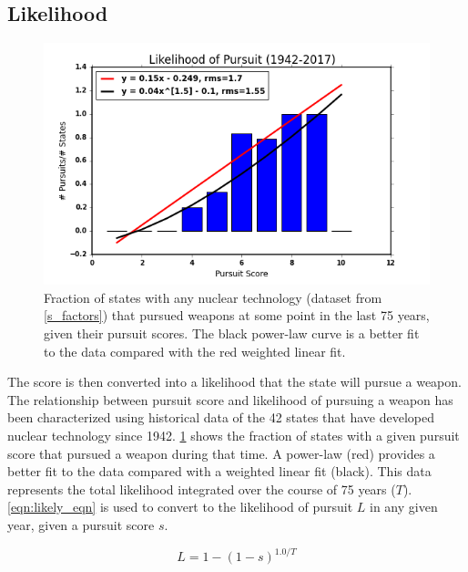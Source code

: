  \subsection{Likelihood}

\begin{figure}%
\begin{center}
\includegraphics[scale=0.8]{./figs/pe_likely.png}
\end{center}
\caption{Fraction of states with any nuclear technology (dataset from \ref{s_factors}) that pursued weapons at some point in the last 75 years, given their pursuit scores. The black power-law curve is a better fit to the data compared with the red weighted linear fit.}
\label{fig:likely}
\end{figure}
 
The score is then converted into a likelihood that the state will pursue a weapon. The relationship between pursuit score and likelihood of pursuing a weapon has been characterized using historical data of the 42 states that have developed nuclear technology since 1942.  \ref{fig:likely} shows the fraction of states with a given pursuit score that pursued a weapon during that time. A power-law (red) provides a better fit to the data compared with a weighted linear fit (black).  This data represents the total likelihood integrated over the course of 75 years ($T$). \ref{eqn:likely_eqn} is used to convert to the likelihood of pursuit $L$ in any given year, given a pursuit score $s$.

\begin{equation}
L = 1 - (1 - s)^{1.0/T}
\label{eqn:likely_eqn}
\end{equation}

